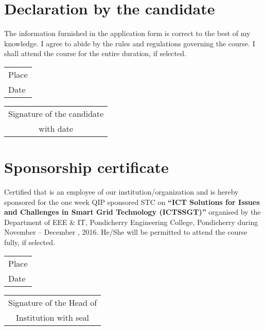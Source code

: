 \documentclass[12pt]{article}
\begin{document}
\section*{Declaration by the candidate}
The information furnished in the application form is correct to the best of my knowledge. I agree to abide by the rules and regulations governing the course. I shall attend the course for the entire duration, if selected.

\bigskip
\noindent
\begin{tabular}{@{}l!{:}}
Place  \\
Date
\end{tabular}

\hfill
\begin{tabular}{c}
Signature of the candidate \\
with date
\end{tabular}

\section*{Sponsorship certificate}
\vspace*{.5\baselineskip}
Certified that \underline{\phantom{\hspace{10cm}}} is an employee of our institution/organization and is hereby sponsored for the one week QIP sponsored STC on \textbf{``ICT \mbox{Solutions} for Issues and Challenges in Smart Grid \mbox{Technology} (ICTSSGT)''} organised by the Department of EEE \& IT, Pondicherry Engineering College, Pondicherry during November  -- December , 2016. He/She will be permitted to attend the course fully, if selected.

\bigskip
\noindent
\begin{tabular}{@{}l!{:}}
Place \\
Date
\end{tabular}

\mbox{}
\hfill
\begin{tabular}{c}
Signature of the Head of \\
Institution with seal
\end{tabular}
\end{document}
